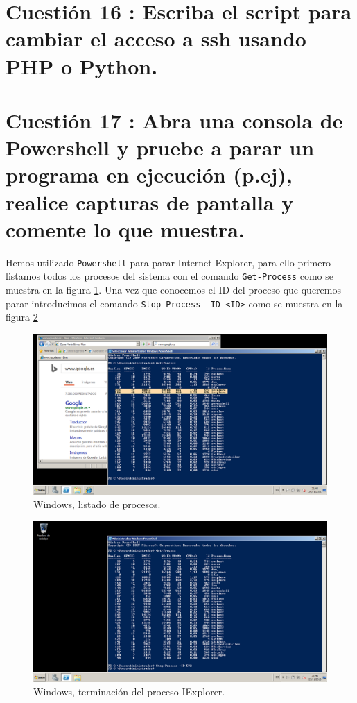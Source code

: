 \section{Cuestión 16 : Escriba el script para cambiar el acceso a ssh usando PHP o Python.}




\section{Cuestión 17 : Abra una consola de Powershell y pruebe a parar un programa en ejecución (p.ej), realice capturas de pantalla y comente lo que muestra.}
Hemos utilizado \texttt{Powershell} para parar Internet Explorer, para ello primero listamos todos los procesos del sistema con el comando \texttt{Get-Process} como se muestra en la figura \ref{fig:ejercicio17_1}. Una vez que conocemos el ID del proceso que queremos parar introducimos el comando \texttt{Stop-Process -ID <ID>} como se muestra en la figura \ref{fig:ejercicio17_2}


\begin{figure}[H] 
	\centering
	\includegraphics[width=15cm]{./img/ejercicio17_1.png} 	
	\caption{Windows, listado de procesos.} \label{fig:ejercicio17_1}
\end{figure}

\begin{figure}[H] 
	\centering
	\includegraphics[width=15cm]{./img/ejercicio17_2.png} 	
	\caption{Windows, terminación del proceso IExplorer.} \label{fig:ejercicio17_2}
\end{figure}

